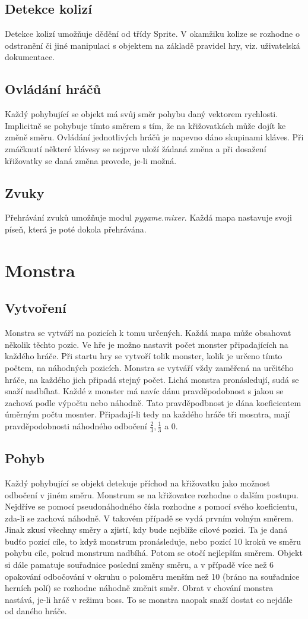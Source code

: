 \documentclass[10pt,a4paper]{article}
\begin{document}
\subsection{Detekce kolizí}
Detekce kolizí umožňuje dědění od třídy Sprite. V okamžiku kolize se rozhodne o odstranění či jiné manipulaci s objektem na základě pravidel hry, viz. uživatelská dokumentace.
\subsection{Ovládání hráčů}
Každý pohybující se objekt má svůj směr pohybu daný vektorem rychlosti. Implicitně se pohybuje tímto směrem s tím, že na křižovatkách může dojít ke změně směru. Ovládání jednotlivých hráčů je napevno dáno skupinami kláves. Při zmáčknutí některé klávesy se nejprve uloží  žádaná změna a při dosažení křižovatky se daná změna provede, je-li možná.
\subsection{Zvuky}
Přehrávání zvuků umožňuje modul \textit{pygame.mixer}. Každá mapa nastavuje svoji píseň, která je poté dokola přehrávána.
\pagebreak 
\section{Monstra}
\subsection{Vytvoření}
Monstra se vytváří na pozicích k tomu určených. Každá mapa může obsahovat několik těchto pozic. Ve hře je možno nastavit počet monster připadajících na každého hráče. Při startu hry se vytvoří tolik monster, kolik je určeno tímto počtem, na náhodných pozicích. Monstra se vytváří vždy zaměřená na určitého hráče, na každého jich  připadá stejný počet. Lichá monstra pronásledují, sudá se snaží nadbíhat. Každé z monster má navíc dánu pravděpodobnost s jakou se zachová podle výpočtu nebo náhodně. Tato pravděpodbnost je dána koeficientem úměrným počtu mosnter. Připadají-li tedy na každého hráče tři mosntra, mají pravděpodobnosti náhodného odbočení $\frac{2}{3},\frac{1}{3}$ a 0.
\subsection{Pohyb}
Každý pohybující se objekt detekuje příchod na křižovatku jako možnost odbočení v jiném směru. Monstrum se na křižovatce rozhodne o dalším postupu. Nejdříve se pomocí pseudonáhodného čísla rozhodne s pomocí svého koeficientu, zda-li se zachová náhodně. V takovém případě se vydá prvním volným směrem. Jinak zkusí všechny směry a zjistí, kdy bude nejblíže cílové pozici. Ta je daná budťo pozicí cíle, to když monstrum pronásleduje, nebo pozicí 10 kroků ve směru pohybu cíle, pokud monstrum nadbíhá. Potom se otočí nejlepším směrem. Objekt si dále pamatuje souřadnice poslední změny směru, a v případě více než 6 opakování odbočování v okruhu o poloměru menším než 10 (bráno na souřadnice herních polí) se rozhodne náhodně změnit směr. Obrat v chování monstra nastává, je-li hráč v režimu boss. To se monstra naopak snaží dostat co nejdále od daného hráče.
\end{document}
